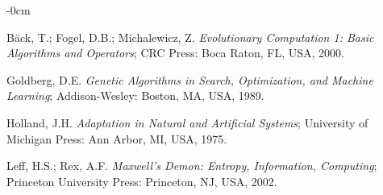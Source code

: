 \documentclass[entropy,article,submit,pdftex,moreauthors]{Definitions/mdpi}
\begin{document}
\begin{adjustwidth}{-\extralength}{0cm}
\begin{thebibliography}{999}
Bäck, T.; Fogel, D.B.; Michalewicz, Z. \textit{Evolutionary Computation 1: Basic Algorithms and Operators}; CRC Press: Boca Raton, FL, USA, 2000.

Goldberg, D.E. \textit{Genetic Algorithms in Search, Optimization, and Machine Learning}; Addison-Wesley: Boston, MA, USA, 1989.

Holland, J.H. \textit{Adaptation in Natural and Artificial Systems}; University of Michigan Press: Ann Arbor, MI, USA, 1975.

Leff, H.S.; Rex, A.F. \textit{Maxwell’s Demon: Entropy, Information, Computing}; Princeton University Press: Princeton, NJ, USA, 2002.


\end{thebibliography}

%


\PublishersNote{}
\end{adjustwidth}
\end{document}
